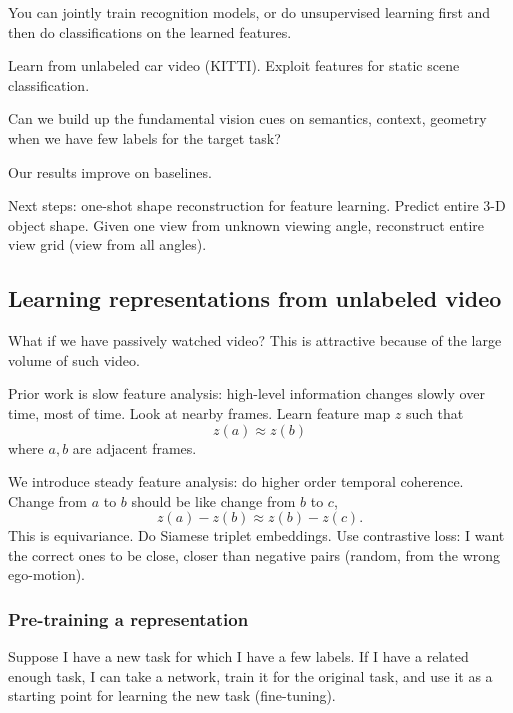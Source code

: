 You can jointly train recognition models, or do unsupervised learning first and then do classifications on the learned features.

Learn from unlabeled car video (KITTI). Exploit features for static scene classification.

Can we build up the fundamental vision cues on semantics, context, geometry when we have few labels for the target task?

Our results improve on baselines.

Next steps: one-shot shape reconstruction for feature learning. Predict entire 3-D object shape. Given one view from unknown viewing angle, reconstruct entire view grid (view from all angles). 

\subsection{Learning representations from unlabeled video}

What if we have passively watched video? This is attractive because of the large volume of such video.

Prior work is slow feature analysis: high-level information changes slowly over time, most of time. 
Look at nearby frames. Learn feature map $z$ such that $$z(a)\approx z(b)$$ where $a,b$ are adjacent frames.

We introduce steady feature analysis: do higher order temporal coherence. Change from $a$ to $b$ should be like change from $b$ to $c$, 
$$z(a)-z(b) \approx z(b)-z(c).$$
This is equivariance. Do Siamese triplet embeddings. 
Use contrastive loss: I want the correct ones to be close, closer than negative pairs (random, from the wrong ego-motion). 

\subsubsection{Pre-training a representation}

Suppose I have a new task for which I have a few labels. If I have a related enough task, I can take a network, train it for the original task, and use it as a starting point for learning the new task (fine-tuning).

